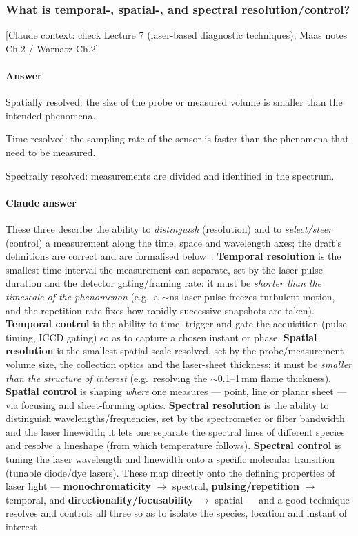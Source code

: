 \subsubsection{What is temporal-, spatial-, and spectral resolution/control?}

{\color{gray}\footnotesize [Claude context: check Lecture 7 (laser-based diagnostic techniques); Maas notes Ch.2 / Warnatz Ch.2]}

\paragraph{Answer}
Spatially resolved: the size of the probe or measured volume is smaller than the intended phenomena.

Time resolved: the sampling rate of the sensor is faster than the phenomena that need to be measured.

Spectrally resolved: measurements are divided and identified in the spectrum.

{\color{istblue}
\paragraph{Claude answer}
These three describe the ability to \emph{distinguish} (resolution) and to \emph{select/steer} (control) a measurement along the time, space and wavelength axes; the draft's definitions are correct and are formalised below~\cite{lecture7}. \textbf{Temporal resolution} is the smallest time interval the measurement can separate, set by the laser pulse duration and the detector gating/framing rate: it must be \emph{shorter than the timescale of the phenomenon} (e.g.\ a $\sim$ns laser pulse freezes turbulent motion, and the repetition rate fixes how rapidly successive snapshots are taken). \textbf{Temporal control} is the ability to time, trigger and gate the acquisition (pulse timing, ICCD gating) so as to capture a chosen instant or phase. \textbf{Spatial resolution} is the smallest spatial scale resolved, set by the probe/measurement-volume size, the collection optics and the laser-sheet thickness; it must be \emph{smaller than the structure of interest} (e.g.\ resolving the $\sim$0.1--1\,mm flame thickness). \textbf{Spatial control} is shaping \emph{where} one measures --- point, line or planar sheet --- via focusing and sheet-forming optics. \textbf{Spectral resolution} is the ability to distinguish wavelengths/frequencies, set by the spectrometer or filter bandwidth and the laser linewidth; it lets one separate the spectral lines of different species and resolve a lineshape (from which temperature follows). \textbf{Spectral control} is tuning the laser wavelength and linewidth onto a specific molecular transition (tunable diode/dye lasers). These map directly onto the defining properties of laser light --- \textbf{monochromaticity} $\to$ spectral, \textbf{pulsing/repetition} $\to$ temporal, and \textbf{directionality/focusability} $\to$ spatial --- and a good technique resolves and controls all three so as to isolate the species, location and instant of interest~\cite{lecture7,crosley1983}.
}




